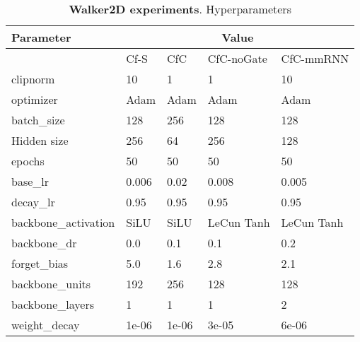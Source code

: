 \documentclass[12pt]{article}
\begin{document}
\begin{table}[t]
    \centering
    \caption{\textbf{Walker2D experiments}. Hyperparameters}
\begin{tabular}{lllll}
\toprule
Parameter & \multicolumn{4}{c}{Value}  \\
\midrule
{} & Cf-S & CfC & CfC-noGate & CfC-mmRNN \\
\midrule
clipnorm & 10 & 1 & 1 & 10 \\ 
optimizer & Adam & Adam & Adam & Adam \\
batch\_size & 128 & 256 & 128 & 128\\
Hidden size & 256 & 64 & 256 & 128 \\
epochs      & 50 & 50 & 50 & 50 \\ 
   base\_lr & 0.006 & 0.02 & 0.008 & 0.005\\
   decay\_lr & 0.95 & 0.95 & 0.95 & 0.95 \\ 
   backbone\_activation & SiLU & SiLU & LeCun Tanh & LeCun Tanh\\ 
   backbone\_dr & 0.0 & 0.1 & 0.1 & 0.2 \\
   forget\_bias & 5.0 & 1.6 & 2.8 & 2.1 \\
   backbone\_units & 192 & 256 & 128 & 128 \\
   backbone\_layers & 1 & 1 & 1 & 2 \\
   weight\_decay & 1e-06 & 1e-06 & 3e-05 & 6e-06 \\ 
\bottomrule
\end{tabular}
    \label{tab:hyperparamswalker2d}
\end{table}

\clearpage
\end{document}
